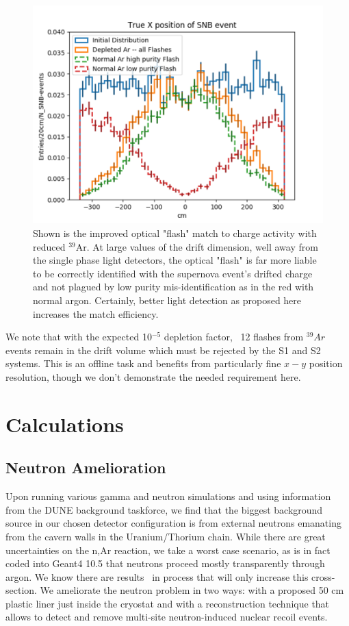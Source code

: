\documentclass[a4paper,11pt]{article}
\begin{document}
\begin{figure}[t]
\begin{centering}
\includegraphics[width=0.90\columnwidth]{Figures/flashmatch.png}
\par\end{centering}

\caption{Shown is the improved optical "flash" match to charge activity with reduced $^{39}$Ar. At large values of the drift dimension, well away from the single phase light detectors, the optical "flash" is far more liable to be correctly identified with  the supernova event's drifted charge and not plagued by low purity mis-identification as in the red with normal argon. Certainly, better light detection as proposed here increases the match efficiency.  \label{fig:flashmatch}}
\end{figure}

We note that with the expected 10$^{-5}$ depletion factor, ~12 flashes from $^{39}Ar$ events remain in the drift volume which must be rejected by the S1 and S2 systems. This is an offline task and benefits from particularly fine $x-y$ position resolution, though we don't demonstrate the needed requirement here.



\section{Calculations}
\subsection{Neutron Amelioration}

Upon running various gamma and neutron simulations and using information from the DUNE background taskforce, we find that the biggest background source in our chosen detector configuration is from external neutrons emanating from the cavern walls in the Uranium/Thorium chain.
While there are great uncertainties on the {n,Ar} reaction, we take a worst case scenario, as is in fact coded into Geant4 10.5 that neutrons proceed mostly transparently through argon. We know there are results~\cite{svoboda} in process that will only increase this cross-section. We ameliorate the neutron problem in two ways: with a proposed 50 cm plastic liner just inside the cryostat and with a reconstruction technique that allows to detect and remove multi-site neutron-induced nuclear recoil events.
\end{document}
